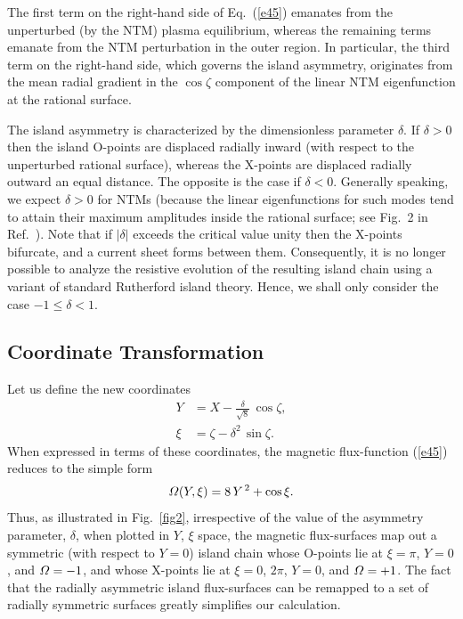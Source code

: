 \documentclass[12pt,prb,aps]{revtex4-1}
\begin{document}
The first term on the right-hand side of Eq.~(\ref{e45}) emanates from the unperturbed (by the NTM) plasma equilibrium, whereas the
remaining terms emanate from the NTM perturbation in the outer region. In particular, the third term on the right-hand
side, which governs the island asymmetry,  originates from  the mean radial gradient in the $\cos\zeta$ component of the linear NTM eigenfunction at the rational surface. 

The island asymmetry is characterized by the dimensionless parameter $\delta$. If $\delta >0$ then the island O-points are displaced radially inward (with respect to the unperturbed rational
surface), whereas the X-points are displaced radially outward an equal distance. The opposite is the case if $\delta <0$. Generally speaking,  we
expect $\delta>0$ for NTMs (because the linear eigenfunctions for such modes tend to attain their
maximum amplitudes inside the rational surface; see Fig.~2 in Ref.~). Note that if  $|\delta|$ exceeds the critical value
unity then the X-points bifurcate, and a current sheet forms between them.\cite{wal}  Consequently,  it is no longer possible to analyze the resistive evolution of the  resulting island chain  using a variant of standard Rutherford island theory.\cite{ntm1} Hence, we shall only consider the case $-1\leq \delta < 1$. 

\subsection{Coordinate Transformation}
Let us define the new coordinates\,\cite{island}
\begin{align}
Y &= X-\frac{\delta}{\sqrt{8}}\,\cos\zeta,\label{ek}\\[0.5ex]
\xi&=\zeta-\delta^2\,\sin\zeta.\label{ekepler}
\end{align}
When expressed in terms of these coordinates, the magnetic flux-function (\ref{e45}) reduces to the simple
form
\begin{equation}\label{eeven}
{\mit\Omega}(Y,\xi) =8\,Y^{\,2}+\cos\xi.
\end{equation}
Thus, as illustrated in Fig.~\ref{fig2}, irrespective of the value of the asymmetry parameter, $\delta$, when
plotted in $Y$, $\xi$ space, the magnetic flux-surfaces map out a symmetric (with respect to $Y=0$) island
chain whose O-points lie at $\xi=\pi$, $Y=0$,
and ${\mit\Omega}=-1$, and whose X-points lie at $\xi=0$, $2\pi$, $Y=0$, and ${\mit\Omega}=+1$.  The fact that the radially asymmetric island flux-surfaces can
be remapped to a set of radially symmetric surfaces greatly simplifies our calculation. 
\end{document}
